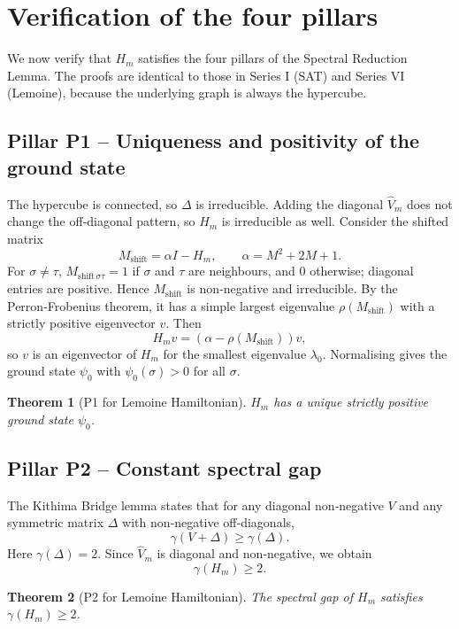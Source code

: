 \documentclass[11pt,a4paper]{article}
\newtheorem{theorem}{Theorem}[section]
\begin{document}
\section{Verification of the four pillars}

We now verify that \(H_m\) satisfies the four pillars of the Spectral Reduction Lemma. The proofs are identical to those in Series I (SAT) and Series VI (Lemoine), because the underlying graph is always the hypercube.

\subsection{Pillar P1 – Uniqueness and positivity of the ground state}

The hypercube is connected, so \(\Delta\) is irreducible. Adding the diagonal \(\hat{V}_m\) does not change the off‑diagonal pattern, so \(H_m\) is irreducible as well. Consider the shifted matrix
\[
M_{\text{shift}} = \alpha I - H_m,\qquad \alpha = M^2 + 2M + 1.
\]
For \(\sigma\neq\tau\), \(M_{\text{shift}\,\sigma\tau} = 1\) if \(\sigma\) and \(\tau\) are neighbours, and \(0\) otherwise; diagonal entries are positive. Hence \(M_{\text{shift}}\) is non‑negative and irreducible. By the Perron‑Frobenius theorem, it has a simple largest eigenvalue \(\rho(M_{\text{shift}})\) with a strictly positive eigenvector \(v\). Then
\[
H_m v = (\alpha - \rho(M_{\text{shift}})) v,
\]
so \(v\) is an eigenvector of \(H_m\) for the smallest eigenvalue \(\lambda_0\). Normalising gives the ground state \(\psi_0\) with \(\psi_0(\sigma) > 0\) for all \(\sigma\).

\begin{theorem}[P1 for Lemoine Hamiltonian]
\(H_m\) has a unique strictly positive ground state \(\psi_0\).
\end{theorem}

\subsection{Pillar P2 – Constant spectral gap}

The Kithima Bridge lemma states that for any diagonal non‑negative \(V\) and any symmetric matrix \(\Delta\) with non‑negative off‑diagonals,
\[
\gamma(V + \Delta) \ge \gamma(\Delta).
\]
Here \(\gamma(\Delta) = 2\). Since \(\hat{V}_m\) is diagonal and non‑negative, we obtain
\[
\gamma(H_m) \ge 2.
\]

\begin{theorem}[P2 for Lemoine Hamiltonian]
The spectral gap of \(H_m\) satisfies \(\gamma(H_m) \ge 2\).
\end{theorem}
\end{document}
